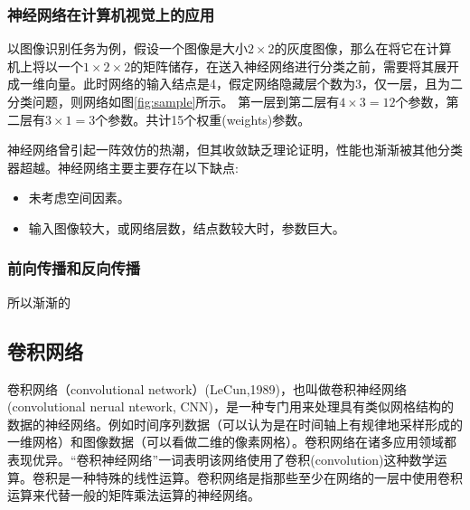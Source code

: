 \documentclass[12pt,a4paper,titlepage]{article}
\begin{document}
\subsubsection*{神经网络在计算机视觉上的应用}
以图像识别任务为例，假设一个图像是大小$2 \times 2$的灰度图像，那么在将它在计算机上将以一个$1 \times 2 \times 2$的矩阵储存，在送入神经网络进行分类之前，需要将其展开成一维向量。此时网络的输入结点是4，假定网络隐藏层个数为3，仅一层，且为二分类问题，则网络如图\ref{fig:sample}所示。
第一层到第二层有$4 \times 3 = 12$个参数，第二层有$3\times 1 = 3 $个参数。共计15个权重(weights)参数。\par
神经网络曾引起一阵效仿的热潮，但其收敛缺乏理论证明，性能也渐渐被其他分类器超越。神经网络主要主要存在以下缺点:
\begin{itemize}

   \item 未考虑空间因素。
   \item 输入图像较大，或网络层数，结点数较大时，参数巨大。
\end{itemize}

\subsubsection*{前向传播和反向传播}

所以渐渐的
\subsection*{卷积网络}
卷积网络（convolutional network）(LeCun,1989)，也叫做卷积神经网络(convolutional nerual ntework, CNN)，是一种专门用来处理具有类似网格结构的数据的神经网络。例如时间序列数据（可以认为是在时间轴上有规律地采样形成的一维网格）和图像数据（可以看做二维的像素网格）。卷积网络在诸多应用领域都表现优异。“卷积神经网络”一词表明该网络使用了卷积(convolution)这种数学运算。卷积是一种特殊的线性运算。卷积网络是指那些至少在网络的一层中使用卷积运算来代替一般的矩阵乘法运算的神经网络。
\end{document}
